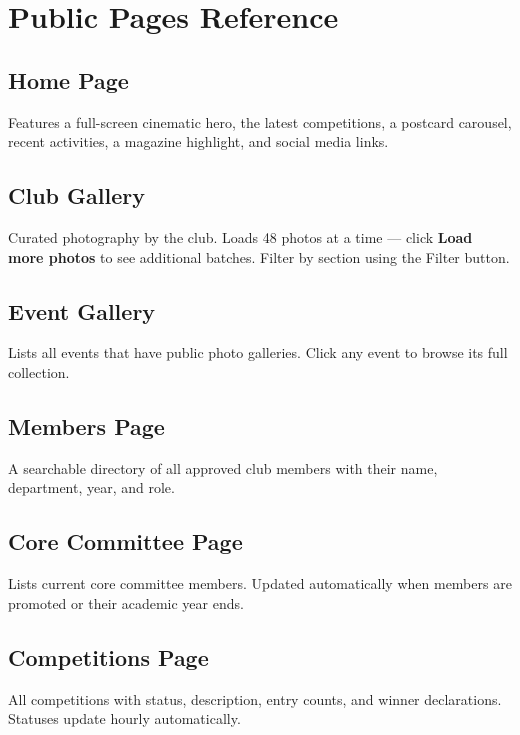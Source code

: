 \documentclass[12pt,a4paper]{article}
\begin{document}
\section{Public Pages Reference}

\subsection{Home Page}

Features a full-screen cinematic hero, the latest competitions, a postcard carousel, recent activities, a magazine highlight, and social media links.

\subsection{Club Gallery}

Curated photography by the club. Loads 48 photos at a time --- click \textbf{Load more photos} to see additional batches. Filter by section using the Filter button.

\subsection{Event Gallery}

Lists all events that have public photo galleries. Click any event to browse its full collection.

\subsection{Members Page}

A searchable directory of all approved club members with their name, department, year, and role.

\subsection{Core Committee Page}

Lists current core committee members. Updated automatically when members are promoted or their academic year ends.

\subsection{Competitions Page}

All competitions with status, description, entry counts, and winner declarations. Statuses update hourly automatically.
\end{document}

